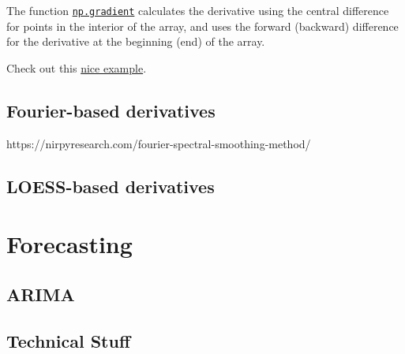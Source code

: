 \documentclass[
  letterpaper,
  DIV=11,
  numbers=noendperiod,
  oneside]{scrreprt}
\begin{document}
The function
\href{https://numpy.org/doc/stable/reference/generated/numpy.gradient.html}{\texttt{np.gradient}}
calculates the derivative using the central difference for points in the
interior of the array, and uses the forward (backward) difference for
the derivative at the beginning (end) of the array.


Check out this
\href{https://gist.github.com/astrojuanlu/e4d47fec5d94d2224762a61680419eb2}{nice
example}.

\hypertarget{fourier-based-derivatives}{%
\chapter{Fourier-based derivatives}\label{fourier-based-derivatives}}

https://nirpyresearch.com/fourier-spectral-smoothing-method/

\hypertarget{loess-based-derivatives}{%
\chapter{LOESS-based derivatives}\label{loess-based-derivatives}}

\part{Forecasting}

\hypertarget{arima}{%
\chapter{ARIMA}\label{arima}}


\hypertarget{technical-stuff}{%
\chapter*{Technical Stuff}\label{technical-stuff}}
\end{document}
